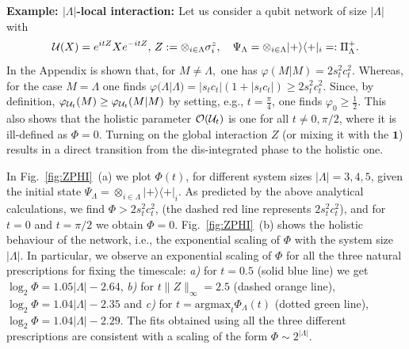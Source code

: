 \documentclass[aps,pra,groupaddress]{revtex4-1}
\begin{document}
{\bf{Example: $|\Lambda|$-local interaction: }}
Let us consider a qubit network of size $|\Lambda|$ with 
\begin{equation}
{\cal U}(X)=e^{itZ}Xe^{-itZ},\,Z:=\otimes_{i\in\Lambda}\sigma_i^z,\quad\Psi_\Lambda= \otimes_{i\in\Lambda}|+\rangle\langle +|_i=:\Pi^{+}_\Lambda.
\end{equation}
In the Appendix is shown that, for $M\neq \Lambda,$ one has
$\varphi(M|M)=2s_t^2 c_t^2.$ %
Whereas, for the case $M=\Lambda$  one finds  $\varphi(\Lambda|\Lambda)=| s_t c_t| (1+|s_t c_t|)\ge 2s_t^2 c_t^2$.
Since, by definition, $\varphi_{{\cal U}_t}(M)\ge \varphi_{{\cal U}_t}(M|M)$ by setting, e.g., $t=\frac{\pi}{4}$, one finds 
$\varphi_0\ge \frac{1}{2}$. This also shows that the holistic parameter $\mathcal{O}({\cal U}_t)$
is one for all $t\neq 0, \pi/2$, where it is ill-defined as $\Phi=0$. 
Turning on the global interaction $Z$ (or mixing it with the $\mathbf{1}$) results in a direct transition from the dis-integrated phase to the holistic one.  

In Fig.~\ref{fig:ZPHI}~(a) we plot $\Phi(t)$, for different system
sizes $|\Lambda|=3,4,5$, given the initial state
$\Psi_\Lambda = \otimes_{i\in\Lambda}|+\rangle\langle +|_i$.
As predicted by the above analytical calculations, we find
$\Phi>2s_t^2 c_t^2$, (the dashed red line represents $2s_t^2 c_t^2$), 
and for $t=0$ and $t=\pi/2$ we obtain $\Phi=0$.
%
Fig.~\ref{fig:ZPHI}~(b) shows the holistic behaviour of the network,
i.e., the exponential scaling of $\Phi$ with the system size
$|\Lambda|$.
In particular, we observe an exponential scaling of $\Phi$ for all the three
natural prescriptions for fixing the timescale:
{\it a)} for $t=0.5$ (solid blue line) we get $\log_{2}\Phi = 1.05 |\Lambda| - 2.64$,
{\it b)} for $t \|Z\|_{\infty}=2.5$ (dashed orange line),
$\log_{2}\Phi = 1.04 |\Lambda| - 2.35$ and
{\it c)} for $t=\mathrm{argmax}_{t}\Phi_{\Lambda}(t)$
(dotted green line), $\log_{2}\Phi=1.04 |\Lambda|-2.29$. The fits
obtained using all the three different prescriptions are consistent
with a scaling of the form $\Phi \sim 2^{|\Lambda|}$.
%
%
\end{document}
